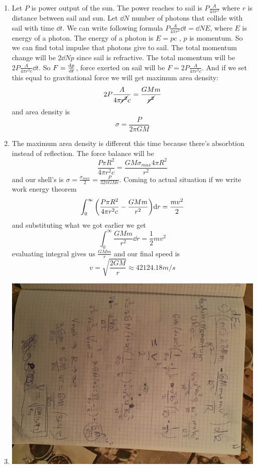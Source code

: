 \begin{sol}
\begin{enumerate}[label=\textbf{(\alph*)}]
\item
Let $P$ is power output of the sun. The power reaches to sail is $P\frac{A}{4\pi r^2}$ where $r$ is distance between sail and sun.
Let $\dd N$ number of photons that collide with sail with time $\dd t$. We can write following formula $P\frac{A}{4\pi r^2}\dd t=\dd N E$, where $E$ is energy of a photon. The energy of a photon is $E=pc$ , $p$ is momentum.
So we can find total impulse that photons give to sail. The total momentum change will be $2\dd Np$ since sail is refractive. The total momentum will be $2P\frac{A}{4\pi r^2c}\dd t$. So $F=\dv{p}{t}$, force exerted on sail will be $F=2P\frac{A}{4\pi r^2c}$. And if we set this equal to
gravitational force we will get maximum area density: $$2P\frac{A}{4\pi \cancel{r^2}c}=\frac{GMm}{\cancel{r^2}}$$ and area density is $$\sigma=\frac{P}{2\pi GM}$$
\item
The maximum area density is different this time because there's absorbtion instead of reflection. The force balance will be $$\frac{P\pi R^2}{4\pi r^2c}=\frac{GM\sigma_{max}4\pi R^2}{r^2}$$ and our shell's is 
$\sigma=\frac{\sigma_{max}}{2}=\frac{P}{32\pi GMc}$. Coming to actual situation if we write work energy theorem $$\int_0^\infty \qty(\frac{P\pi R^2}{4\pi r^2c}-\frac{GMm}{r^2})\dd r=\frac{mv^2}{2}$$ and substituting what we got earlier we
get $$\int_0^\infty\frac{GMm}{r^2}\dd r=\frac12mv^2$$ evaluating integral gives us $\frac{GMm}{r}$ and our final speed is $$v=\sqrt{\frac{2GM}{r}}\approx 42124.18 m/s$$
\item
\begin{center}
    \includegraphics[width=\columnwidth]{question2_partC.jpg}

\end{center}
\end{enumerate}
\end{sol}
